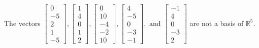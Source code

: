 \begin{exercise}
\begin{exerciseStatement}
  \end{exerciseStatement}
  \begin{exerciseAnswer}
   The vectors \(\left[\begin{array}{r}
0 \\
-5 \\
2 \\
1 \\
-5
\end{array}\right] , \left[\begin{array}{r}
1 \\
4 \\
0 \\
1 \\
2
\end{array}\right] , \left[\begin{array}{r}
0 \\
10 \\
-4 \\
-2 \\
10
\end{array}\right] , \left[\begin{array}{r}
4 \\
-5 \\
0 \\
-3 \\
-1
\end{array}\right] , \text{ and } \left[\begin{array}{r}
-1 \\
4 \\
0 \\
-3 \\
2
\end{array}\right]\) 
  	 are not  a basis of \(\mathbb{R}^5\).
  


  \end{exerciseAnswer}
\end{exercise}